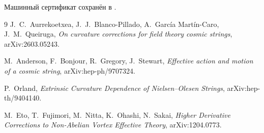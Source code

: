 Машинный сертификат сохранён в
.

\begin{thebibliography}{9}
J.~C.~Aurrekoetxea, J.~J.~Blanco-Pillado,
A.~Garc\'ia Mart\'in-Caro, J.~M.~Queiruga,
\emph{On curvature corrections for field theory cosmic strings},
arXiv:2603.05243.

M.~Anderson, F.~Bonjour, R.~Gregory, J.~Stewart,
\emph{Effective action and motion of a cosmic string},
arXiv:hep-ph/9707324.

P.~Orland,
\emph{Extrinsic Curvature Dependence of Nielsen--Olesen Strings},
arXiv:hep-th/9404140.

M.~Eto, T.~Fujimori, M.~Nitta, K.~Ohashi, N.~Sakai,
\emph{Higher Derivative Corrections to Non-Abelian Vortex Effective Theory},
arXiv:1204.0773.
\end{thebibliography}